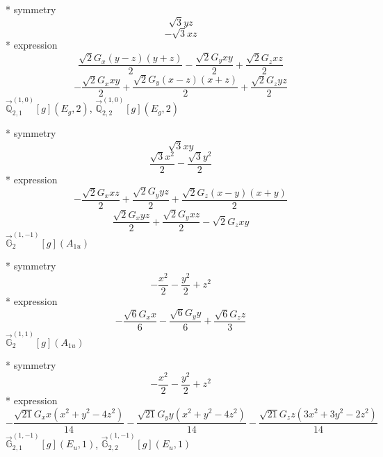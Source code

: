 \documentclass[fleqn,8pt]{jsarticle}
\begin{document}
\noindent\quad ** symmetry
\begin{dmath*}
\sqrt{3} y z
\end{dmath*}
\begin{dmath*}
- \sqrt{3} x z
\end{dmath*}
\noindent\quad ** expression
\begin{dmath*}
\frac{\sqrt{2} G_{x} \left(y - z\right) \left(y + z\right)}{2} - \frac{\sqrt{2} G_{y} x y}{2} + \frac{\sqrt{2} G_{z} x z}{2}
\end{dmath*}
\begin{dmath*}
- \frac{\sqrt{2} G_{x} x y}{2} + \frac{\sqrt{2} G_{y} \left(x - z\right) \left(x + z\right)}{2} + \frac{\sqrt{2} G_{z} y z}{2}
\end{dmath*}
\noindent\quad $\vec{\mathbb{Q}}_{2,1}^{(1,0)}[g](E_{g},2)$, $\vec{\mathbb{Q}}_{2,2}^{(1,0)}[g](E_{g},2)$

\noindent\quad ** symmetry
\begin{dmath*}
\sqrt{3} x y
\end{dmath*}
\begin{dmath*}
\frac{\sqrt{3} x^{2}}{2} - \frac{\sqrt{3} y^{2}}{2}
\end{dmath*}
\noindent\quad ** expression
\begin{dmath*}
- \frac{\sqrt{2} G_{x} x z}{2} + \frac{\sqrt{2} G_{y} y z}{2} + \frac{\sqrt{2} G_{z} \left(x - y\right) \left(x + y\right)}{2}
\end{dmath*}
\begin{dmath*}
\frac{\sqrt{2} G_{x} y z}{2} + \frac{\sqrt{2} G_{y} x z}{2} - \sqrt{2} G_{z} x y
\end{dmath*}
\noindent\quad $\vec{\mathbb{G}}_{2}^{(1,-1)}[g](A_{1u})$

\noindent\quad ** symmetry
\begin{dmath*}
- \frac{x^{2}}{2} - \frac{y^{2}}{2} + z^{2}
\end{dmath*}
\noindent\quad ** expression
\begin{dmath*}
- \frac{\sqrt{6} G_{x} x}{6} - \frac{\sqrt{6} G_{y} y}{6} + \frac{\sqrt{6} G_{z} z}{3}
\end{dmath*}
\noindent\quad $\vec{\mathbb{G}}_{2}^{(1,1)}[g](A_{1u})$

\noindent\quad ** symmetry
\begin{dmath*}
- \frac{x^{2}}{2} - \frac{y^{2}}{2} + z^{2}
\end{dmath*}
\noindent\quad ** expression
\begin{dmath*}
- \frac{\sqrt{21} G_{x} x \left(x^{2} + y^{2} - 4 z^{2}\right)}{14} - \frac{\sqrt{21} G_{y} y \left(x^{2} + y^{2} - 4 z^{2}\right)}{14} - \frac{\sqrt{21} G_{z} z \left(3 x^{2} + 3 y^{2} - 2 z^{2}\right)}{14}
\end{dmath*}
\noindent\quad $\vec{\mathbb{G}}_{2,1}^{(1,-1)}[g](E_{u},1)$, $\vec{\mathbb{G}}_{2,2}^{(1,-1)}[g](E_{u},1)$
\end{document}
